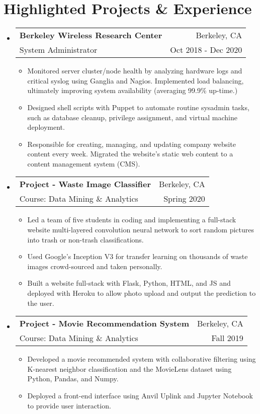 \documentclass[letterpaper,11pt]{article}
\makeatletter
\newcommand{\resumeSubheading}[4]{
	\vspace{-1pt}\item
	\begin{tabular*}{0.97\textwidth}{l@{\extracolsep{\fill}}r}
		\textbf{#1} & #2 \\
		\small#3 & \small #4 \\
	\end{tabular*}\vspace{-5pt}
}
\newcommand{\resumeSubHeadingListStart}{\begin{itemize}[leftmargin=*]}
\newcommand{\resumeSubHeadingListEnd}{\end{itemize}}
\makeatother
\begin{document}
	\section{Highlighted Projects \& Experience}
	\resumeSubHeadingListStart
	\resumeSubheading
	{Berkeley Wireless Research Center}{Berkeley, CA}
	{System Administrator}{Oct 2018 - Dec 2020}
	\begin{itemize}
		\item {Monitored server cluster/node health by analyzing hardware logs and critical syslog using Ganglia and Nagios. Implemented load balancing, ultimately improving system availability (averaging 99.9\% up-time.)}
		\item {Designed shell scripts with Puppet to automate routine sysadmin tasks, such as database cleanup, privilege assignment, and virtual machine deployment.}
		\item {Responsible for creating, managing, and updating company website content every week. Migrated the website's static web content to a content management system (CMS).}
	\end{itemize}
	
	\resumeSubheading
	{Project - Waste Image Classifier}{Berkeley, CA}
	{Course: Data Mining \& Analytics}{Spring 2020}
	\begin{itemize}
		\item {Led a team of five students in coding and implementing a full-stack website multi-layered convolution neural network to sort random pictures into trash or non-trash classifications.}
		\item {Used Google's Inception V3 for transfer learning on thousands of waste images crowd-sourced and taken personally.}
		\item {Built a website full-stack with Flask, Python, HTML, and JS and deployed with Heroku to allow photo upload and output the prediction to the user.}
	\end{itemize}
	\resumeSubheading
	{Project - Movie Recommendation System}{Berkeley, CA}
	{Course: Data Mining \& Analytics}{Fall 2019}
	\begin{itemize}
		\item {Developed a movie recommended system with collaborative filtering using K-nearest neighbor classification and the MovieLens dataset using Python, Pandas, and Numpy.}
		\item {Deployed a front-end interface using Anvil Uplink and Jupyter Notebook to provide user interaction.}
	\end{itemize}
	\resumeSubHeadingListEnd
	
\end{document}
